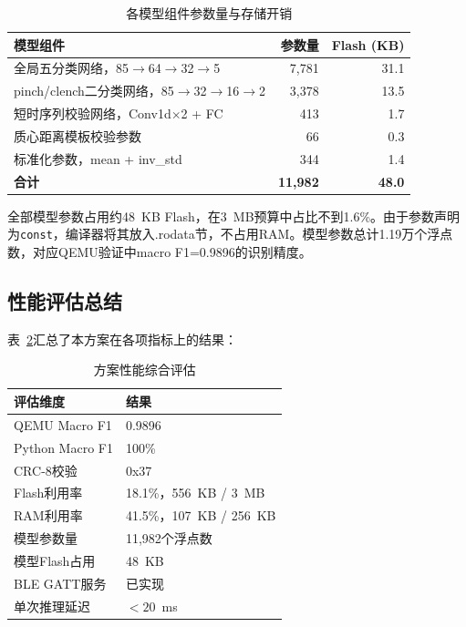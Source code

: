 \documentclass[lettersize,journal]{IEEEtran}
\begin{document}
\begin{table}[htbp]
    \centering
    \caption{各模型组件参数量与存储开销}
    \label{tab:model_params}
    \begin{tabular}{lrr}
        \toprule
        \textbf{模型组件} & \textbf{参数量} & \textbf{Flash (KB)} \\
        \midrule
        全局五分类网络，85$\to$64$\to$32$\to$5   & 7,781 & 31.1 \\
        pinch/clench二分类网络，85$\to$32$\to$16$\to$2 & 3,378 & 13.5 \\
        短时序列校验网络，Conv1d$\times$2 + FC & 413   & 1.7 \\
        质心距离模板校验参数    & 66    & 0.3 \\
        标准化参数，mean + inv\_std & 344   & 1.4 \\
        \midrule
        \textbf{合计}             & \textbf{11,982} & \textbf{48.0} \\
        \bottomrule
    \end{tabular}
\end{table}

全部模型参数占用约48~KB Flash，在3~MB预算中占比不到1.6\%。由于参数声明为\texttt{const}，编译器将其放入.rodata节，不占用RAM。模型参数总计1.19万个浮点数，对应QEMU验证中macro F1=0.9896的识别精度。

\subsection{性能评估总结}

表~\ref{tab:performance_summary}汇总了本方案在各项指标上的结果：

\begin{table}[htbp]
    \centering
    \caption{方案性能综合评估}
    \label{tab:performance_summary}
    \begin{tabular}{ll}
        \toprule
        \textbf{评估维度} & \textbf{结果} \\
        \midrule
        QEMU Macro F1    & 0.9896 \\
        Python Macro F1  & 100\% \\
        CRC-8校验       & 0x37 \\
        Flash利用率     & 18.1\%，556~KB / 3~MB \\
        RAM利用率       & 41.5\%，107~KB / 256~KB \\
        模型参数量       & 11,982个浮点数 \\
        模型Flash占用    & 48~KB \\
        BLE GATT服务    & 已实现 \\
        单次推理延迟     & $< 20$~ms \\
        \bottomrule
    \end{tabular}
\end{table}
\end{document}
